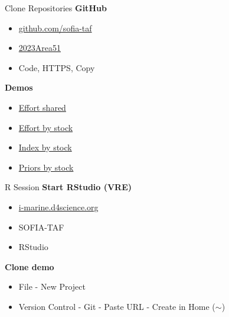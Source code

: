 \documentclass[aspectratio=169]{beamer}
\begin{document}

\begin{frame}{Clone Repositories}
  \textbf{\darkgreen GitHub}\\[0.5ex]
  \begin{itemize}\blue
    \item[] \href{https://github.com/sofia-taf}{github.com/sofia-taf}\\[1ex]
    \item[] \href{https://github.com/sofia-taf/2023Area51Demo}{2023Area51}\black
    \item[] Code, HTTPS, Copy\\[1ex]
  \end{itemize}
  \vspace{3ex}
  \textbf{\darkgreen Demos}\\[0.5ex]
  \begin{itemize}\blue
    \item[] \href{https://github.com/sofia-taf/2022Area31DemoEffortShared}%
    {Effort shared}\\[1ex]
    \item[] \href{https://github.com/sofia-taf/2022Area31DemoEffortByStock}%
    {Effort by stock}\\[1ex]
    \item[] \href{https://github.com/sofia-taf/2022Area31DemoIndexByStock}%
    {Index by stock}\\[1ex]
    \item[] \href{https://github.com/sofia-taf/2022Area41DemoPriorsByStock}%
    {Priors by stock}
  \end{itemize}
\end{frame}


\begin{frame}{R Session}
  \textbf{\darkgreen Start RStudio (VRE)}\\[0.3ex]
  \begin{itemize}
    \item[] {\blue\href{https://i-marine.d4science.org/}%
      {i-marine.d4science.org}}\\[1ex]
    \item[] SOFIA-TAF\\[1ex]
    \item[] RStudio\\[1ex]
  \end{itemize}
  \vspace{4ex}
  \textbf{\darkgreen Clone demo}\\[0.3ex]
  \begin{itemize}
    \item[] File - New Project\\[1ex]
    \item[] Version Control - Git - Paste URL - Create in Home ($\sim$)\\[1ex]
  \end{itemize}
\end{frame}
\end{document}
